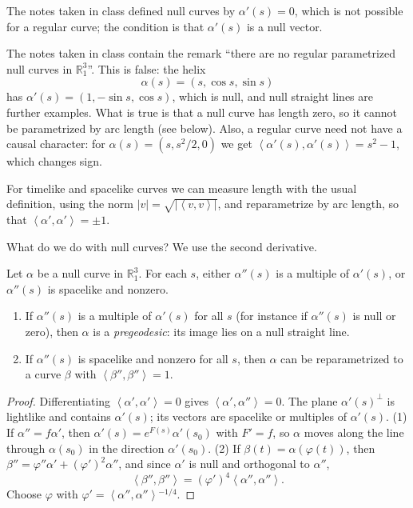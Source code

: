 The notes taken in class defined null
curves by $\alpha'(s)=0$, which is not
possible for a regular curve; the
condition is that $\alpha'(s)$ is a null
vector.

\begin{remark}
\label{remark-palmas-null-curves-exist}
The notes taken in class contain the
remark ``there are no regular parametrized
null curves in $\mathbb{R}^3_1$''. This is
false: the helix
$$
\alpha(s)=(s,\cos s,\sin s)
$$
has $\alpha'(s)=(1,-\sin s,\cos s)$, which
is null, and null straight lines are
further examples. What is true is that a
null curve has length zero, so it cannot
be parametrized by arc length (see below).
Also, a regular curve need not have a
causal character: for
$\alpha(s)=(s,s^2/2,0)$ we get
$\left\langle{} \alpha'(s),\alpha'(s)
\right\rangle{}=s^2-1$, which changes sign.
\end{remark}

For timelike and spacelike curves we can
measure length with the usual definition,
using the norm $|v|=\sqrt{|\left\langle{}
v,v \right\rangle{}|}$, and reparametrize
by arc length, so that
$\left\langle{} \alpha',\alpha'
\right\rangle{}=\pm 1$.

What do we do with null curves? We use the
second derivative.

\begin{proposition}
\label{proposition-palmas-null-curves}
Let $\alpha$ be a null curve in
$\mathbb{R}^3_1$. For each $s$, either
$\alpha''(s)$ is a multiple of
$\alpha'(s)$, or $\alpha''(s)$ is
spacelike and nonzero.
\begin{enumerate}
\item If $\alpha''(s)$ is a multiple of
$\alpha'(s)$ for all $s$ (for instance if
$\alpha''(s)$ is null or zero), then
$\alpha$ is a \emph{pregeodesic}: its
image lies on a null straight line.
\item If $\alpha''(s)$ is spacelike and
nonzero for all $s$, then $\alpha$ can be
reparametrized to a curve $\beta$ with
$\left\langle{} \beta'',\beta''
\right\rangle{}=1$.
\end{enumerate}
\end{proposition}

\begin{proof}
Differentiating
$\left\langle{} \alpha',\alpha'
\right\rangle{}=0$ gives
$\left\langle{} \alpha',\alpha''
\right\rangle{}=0$. The plane
$\alpha'(s)^{\perp}$ is lightlike and
contains $\alpha'(s)$; its vectors are
spacelike or multiples of $\alpha'(s)$.
(1) If $\alpha''=f\alpha'$, then
$\alpha'(s)=e^{F(s)}\alpha'(s_0)$ with
$F'=f$, so $\alpha$ moves along the line
through $\alpha(s_0)$ in the direction
$\alpha'(s_0)$.
(2) If $\beta(t)=\alpha(\varphi(t))$, then
$\beta''=\varphi''\alpha'
+(\varphi')^2\alpha''$, and since $\alpha'$
is null and orthogonal to $\alpha''$,
$$
\left\langle{} \beta'',\beta''
\right\rangle{}
=(\varphi')^4\left\langle{}
\alpha'',\alpha'' \right\rangle{}.
$$
Choose $\varphi$ with
$\varphi'=\left\langle{} \alpha'',\alpha''
\right\rangle{}^{-1/4}$.
\end{proof}

